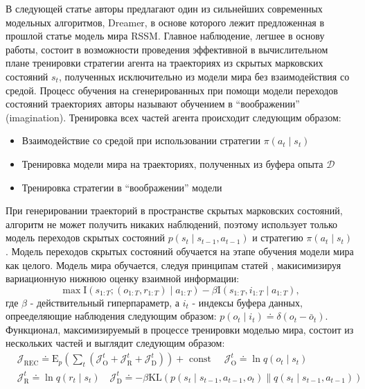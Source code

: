 В следующей статье \cite{dreamer} авторы предлагают один из сильнейших современных модельных алгоритмов, Dreamer, в основе которого лежит предложенная в прошлой статье модель мира RSSM.
Главное наблюдение, легшее в основу работы, состоит в возможности проведения эффективной в вычислительном плане тренировки стратегии агента на траекториях из скрытых марковских состояний $s_t$, полученных исключительно из модели мира без взаимодействия со средой.
Процесс обучения на сгенерированных при помощи модели переходов состояний траекториях авторы называют обучением в ``воображении'' (imagination).
Тренировка всех частей агента происходит следующим образом:
\begin{itemize}
    \item Взаимодействие со средой при использовании стратегии $\pi\left(a_t \mid s_t\right)$
    \item Тренировка модели мира на траекториях, полученных из буфера опыта $\mathcal{D}$
    \item Тренировка стратегии в ``воображении'' модели
\end{itemize}
При генерировании траекторий в пространстве скрытых марковских состояний, алгоритм не может получить никаких наблюдений, поэтому использует только модель переходов скрытых состояний $p\left(s_t \mid s_{t-1}, a_{t-1}\right)$ и стратегию $\pi\left(a_t \mid s_t\right)$.
Модель переходов скрытых состояний обучается на этапе обучения модели мира как целого.
Модель мира обучается, следуя принципам статей \cite{VIB,DeepVIB}, макисимизируя вариационную нижнюю оценку взаимной информации:
\begin{equation}
    \max \mathrm{I}\left(s_{1: T} ;\left(o_{1: T}, r_{1: T}\right) \mid a_{1: T}\right)-\beta \mathrm{I}\left(s_{1: T}, i_{1: T} \mid a_{1: T}\right),
\end{equation}
где $\beta$ - действительный гиперпараметр, а $i_t$ - индексы буфера данных, опрееделяющие наблюдения следующим образом: $p\left(o_{t} \mid i_{t}\right) \doteq \delta\left(o_{t}-\bar{o}_{t}\right)$.
Функционал, максимизируемый в процессе тренировки моделью мира, состоит из нескольких частей и выглядит следующим образом:
\begin{align}
&\mathcal{J}_{\mathrm{REC}} \doteq \mathrm{E}_{p}\left(\sum_{t}\left(\mathcal{J}_{\mathrm{O}}^{t}+\mathcal{J}_{\mathrm{R}}^{t}+\mathcal{J}_{\mathrm{D}}^{t}\right)\right)+\text { const } \quad \mathcal{J}_{\mathrm{O}}^{t} \doteq \ln q\left(o_{t} \mid s_{t}\right) \\
&\mathcal{J}_{\mathrm{R}}^{t} \doteq \ln q\left(r_{t} \mid s_{t}\right) \quad \mathcal{J}_{\mathrm{D}}^{t} \doteq-\beta \mathrm{KL}\left(p\left(s_{t} \mid s_{t-1}, a_{t-1}, o_{t}\right) \| q\left(s_{t} \mid s_{t-1}, a_{t-1}\right)\right)
\label{eq:elbo_loss}
\end{align}
